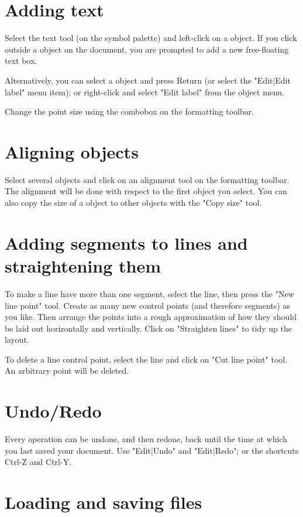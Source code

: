 \section{Adding text}

Select the text tool (on the symbol palette) and left-click on
a object. If you click outside a object on the document, you are
prompted to add a new free-floating text box.

Alternatively, you can select a object and press Return (or
select the "Edit|Edit label" menu item); or right-click and
select "Edit label" from the object menu.

Change the point size using the combobox on the formatting
toolbar.

\section{Aligning objects}

Select several objects and click on an alignment tool on
the formatting toolbar. The alignment will be done with
respect to the first object you select. You can also copy
the size of a object to other objects with the "Copy size" tool.

\section{Adding segments to lines and straightening them}

To make a line have more than one segment, select the line,
then press the "New line point" tool. Create as many new control points
(and therefore segments) as you like. Then arrange the points
into a rough approximation of how they should be laid out
horizontally and vertically. Click on "Straighten lines" to
tidy up the layout.

To delete a line control point, select the line and click on
"Cut line point" tool. An arbitrary point will be deleted.

\section{Undo/Redo}

Every operation can be undone, and then redone, back until
the time at which you last saved your document. Use
"Edit|Undo" and "Edit|Redo"; or the shortcuts Ctrl-Z and Ctrl-Y.

\section{Loading and saving files}

